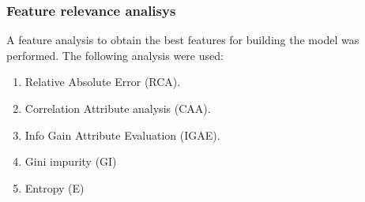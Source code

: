 \documentclass[
serif,
compress,
xcolor=table,
dvipsnames,
]{beamer}
\begin{document}
\begin{frame}
\frametitle{Feature relevance analisys}
A feature analysis to obtain the best features for building the model was performed. The following analysis were used:
\begin{enumerate}
    \item Relative Absolute Error (RCA).
    \item Correlation Attribute analysis (CAA).
    \item Info Gain Attribute Evaluation (IGAE).
    \item Gini impurity (GI)
    \item Entropy (E)
\end{enumerate}
\end{frame}





% 



% 
%     
%     
\end{document}
